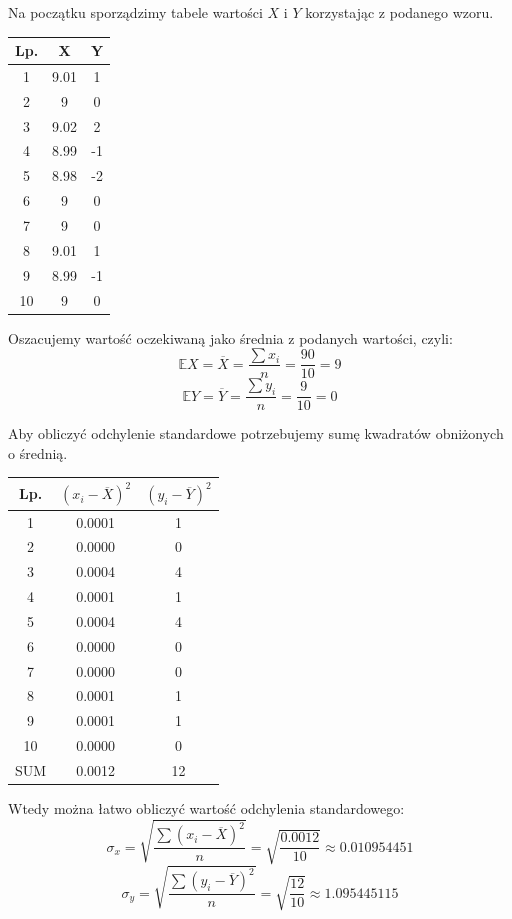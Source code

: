 \documentclass{article}
\begin{document}
Na początku sporządzimy tabele wartości $X$ i $Y$ korzystając z podanego wzoru.
\begin{center}
\begin{tabular}{|c|c|c|}
\hline
Lp. & X & Y \\ \hline
1 & 9.01	& 1 \\ \hline
2& 9 &	0 \\ \hline
3 &9.02	& 2 \\ \hline
4 & 8.99	& -1\\ \hline
5 & 8.98	& -2\\ \hline
6 & 9	 &0\\ \hline
7 & 9	&0\\ \hline
8 & 9.01	&1\\ \hline
9 & 8.99	&-1\\ \hline
10 & 9	&0\\ \hline
\end{tabular}
\end{center}
Oszacujemy wartość oczekiwaną jako średnia z podanych wartości, czyli:
\[ \mathbb{E}X = \overline{X} = \frac{\sum x_i}{n} = \frac{90}{10} = 9 \]
\[ \mathbb{E}Y = \overline{Y} = \frac{\sum y_i}{n} = \frac{9}{10} = 0 \]

Aby obliczyć odchylenie standardowe potrzebujemy sumę kwadratów obniżonych o średnią.
\begin{center}
\begin{tabular}{|c|c|c|}
\hline
Lp. & $(x_i - \overline{X})^2$ & $(y_i - \overline{Y})^2$ \\ \hline
1 & 0.0001	 & 1 \\ \hline
2 & 0.0000	 & 0 \\ \hline
3 & 0.0004	 & 4 \\ \hline
4 & 0.0001	 & 1 \\ \hline
5 & 0.0004	 & 4 \\ \hline
6 & 0.0000	 & 0 \\ \hline
7 & 0.0000	 & 0 \\ \hline
8 & 0.0001	 & 1 \\ \hline
9 & 0.0001	 & 1 \\ \hline
10 & 0.0000 & 0 \\ \hline
SUM & 0.0012 & 12 \\ \hline
\end{tabular}
\end{center}

Wtedy można łatwo obliczyć wartość odchylenia standardowego:
\[ \sigma_x = \sqrt{\frac{\sum (x_i - \overline{X})^2}{n}} = \sqrt{\frac{0.0012}{10}} \approx 0.010954451 \]
\[ \sigma_y = \sqrt{\frac{\sum (y_i - \overline{Y})^2}{n}} = \sqrt{\frac{12}{10}} \approx 1.095445115 \]
\end{document}
